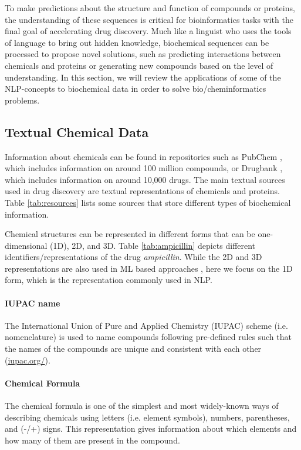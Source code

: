 \documentclass[review]{elsarticle}
\begin{document}
To make predictions about the structure and function of compounds or proteins, the understanding of these sequences is critical for bioinformatics tasks with the final goal of accelerating drug discovery. Much like a linguist who uses the tools of language to bring out hidden knowledge, biochemical sequences can be processed to propose novel solutions, such as predicting interactions between chemicals and proteins or generating new compounds based on the level of understanding. In this section, we will review the applications of some of the NLP-concepts to biochemical data in order to solve bio/cheminformatics problems. 


\subsection{Textual Chemical Data} \label{section:availabledata}

Information about chemicals can be found in repositories such as PubChem \cite{bolton2008pubchem}, which includes information on around 100 million compounds, or Drugbank \cite{wishart2006drugbank}, which includes information on around 10,000 drugs. The main textual sources used in drug discovery are textual representations of chemicals and proteins. Table \ref{tab:resources} lists some sources that store different types of biochemical information.  


Chemical structures can be represented in different forms that can be one-dimensional (1D), 2D, and 3D. Table \ref{tab:ampicillin} depicts  different identifiers/representations of the drug \textit{ampicillin}. While the 2D and 3D representations are also used in ML based approaches \cite{lo2018machine}, here we focus on the 1D form, which is the representation commonly used in NLP.   


\paragraph{IUPAC name} The International Union of Pure and Applied Chemistry (IUPAC) scheme (i.e. nomenclature) is used to name compounds following pre-defined rules such that the names of the compounds are unique and consistent with each other (\url{iupac.org/}).  

\paragraph{Chemical Formula}
The chemical formula is one of the simplest and most widely-known ways of describing chemicals using letters (i.e. element symbols), numbers, parentheses, and (-/+) signs. This representation gives information about which elements and how many of them are present in the compound. 
\end{document}
